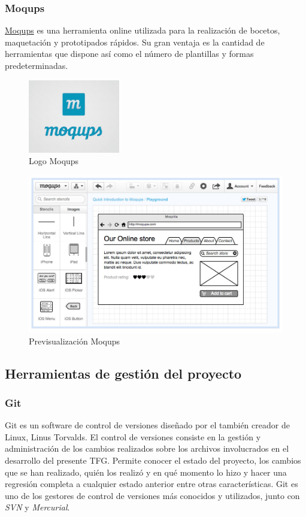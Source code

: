 		\subsubsection{Moqups}		
		\href{https://moqups.com}{Moqups} es una herramienta online utilizada para la realización de bocetos, maquetación y prototipados rápidos. Su gran ventaja es la cantidad de herramientas que dispone así como el número de plantillas y formas predeterminadas.
			
		\begin{figure}[H]
		\centering
		\includegraphics[width=40mm, fbox={\fboxrule} 4mm]{images/04-metodo/16-moqups_logo.png}
		\caption{Logo Moqups}
		\label{fig:moqups-logo}
		\end{figure}
		
		\begin{figure}[H]
		\centering
		\includegraphics[width=120mm, fbox={\fboxrule} 4mm]{images/04-metodo/17-moqups_preview.jpg}
		\caption{Previsualización Moqups}
		\label{fig:gantt-project-logo}
		\end{figure}
		
	\subsection{Herramientas de gestión del proyecto}
		\subsubsection{Git}
		Git es un software de control de versiones diseñado por el también creador de Linux, Linus Torvalds. El control de versiones consiste en la gestión y administración de los cambios realizados sobre los archivos involucrados en el desarrollo del presente \ac{TFG}. Permite conocer el estado del proyecto, los cambios que se han realizado, quién los realizó y en qué momento lo hizo y hacer una regresión completa a cualquier estado anterior entre otras características.
		Git es uno de los gestores de control de versiones más conocidos y utilizados, junto con \textit{\ac{SVN}} y \textit{Mercurial}.
		
